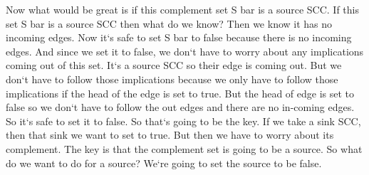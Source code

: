Now what would be great is if this complement set S bar is a source SCC\@.
If this set S bar is a source SCC then what do we know? Then we know it has no incoming edges.
Now it`s safe to set S bar to false because there is no incoming edges.
And since we set it to false, we don`t have to worry about any implications coming out of this set.
It`s a source SCC so their edge is coming out.
But we don`t have to follow those implications because we only have to follow those implications if the head of the edge is set to true.
But the head of edge is set to false so we don`t have to follow the out edges and there are no in-coming edges.
So it`s safe to set it to false.
So that`s going to be the key.
If we take a sink SCC, then that sink we want to set to true.
But then we have to worry about its complement.
The key is that the complement set is going to be a source.
So what do we want to do for a source? We`re going to set the source to be false.

